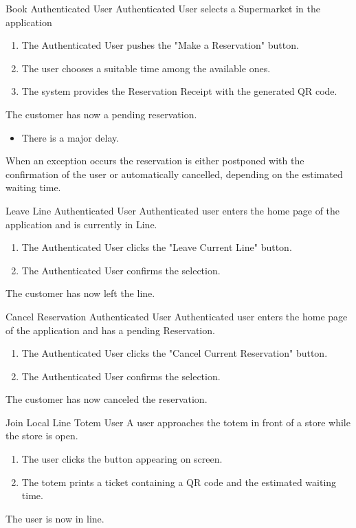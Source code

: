 \usecase
{Book}
{Authenticated User}
{Authenticated User selects a Supermarket in the application}
{
        \begin{enumerate}
            \item The Authenticated User pushes the "Make a Reservation" button.
            \item The user chooses a suitable time among the available ones. 
            \item The system provides the Reservation Receipt with the generated QR code.
        \end{enumerate}
}
{
    The customer has now a pending reservation.
}
{
    \begin{itemize}
        \item There is a major delay.
    \end{itemize}
}
{
    When an exception occurs the reservation is either postponed with the confirmation of the user or automatically cancelled, depending on the estimated waiting time. 
}


\usecase
{Leave Line}
{Authenticated User}
{Authenticated user enters the home page of the application and is currently in Line.}
{
    \begin{enumerate}
        \item The Authenticated User clicks the "Leave Current Line" button.
        \item The Authenticated User confirms the selection.
    \end{enumerate}
}
{
    The customer has now left the line.
}
{}
{}

\usecase
{Cancel Reservation}
{Authenticated User}
{Authenticated user enters the home page of the application and has a pending Reservation.}
{
    \begin{enumerate}
        \item The Authenticated User clicks the "Cancel Current Reservation" button.
        \item The Authenticated User confirms the selection.
    \end{enumerate}
}
{
    The customer has now canceled the reservation.
}
{}
{}

\usecase
{Join Local Line}
{Totem User}
{A user approaches the totem in front of a store while the store is open.}
{
    \begin{enumerate}
        \item The user clicks the button appearing on screen.
        \item The totem prints a ticket containing a QR code and the estimated waiting time.
    \end{enumerate}
}
{
    The user is now in line.
}
{}
{}

